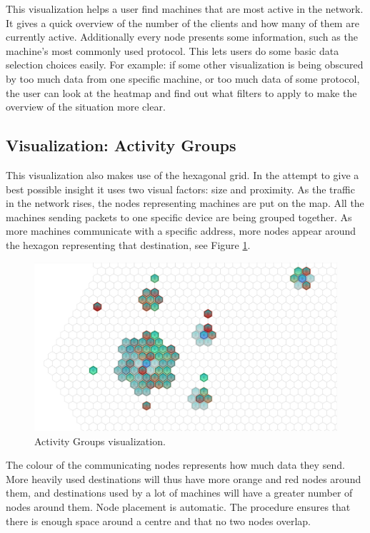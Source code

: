 This visualization helps a user find machines that are most active in the network.
It gives a quick overview of the number of the clients and how many of them are currently active.
Additionally every node presents some information, such as the machine's most commonly used protocol. This lets users do some basic data selection choices easily. For example: if some other visualization is being obscured by too much data from one specific machine, or too much data of some protocol, the user can look at the heatmap and find out what filters to apply to make the overview of the situation more clear.

\subsection{Visualization: Activity Groups}
%
This visualization also makes use of the hexagonal grid. In the attempt to give a best possible
insight it uses two visual factors: size and proximity. As the traffic in the network rises, the
nodes representing machines are put on the map. All the machines sending packets to one specific
device are being grouped together. As more machines communicate with a specific address, more nodes
appear around the hexagon representing that destination, see Figure \ref{fig:groups}.

\begin{figure}[htb]
   \centering
   \includegraphics[width=\linewidth]{materials/groups.jpg}
   \caption[Activity Groups]{\label{fig:groups}
         Activity Groups visualization.}
\end{figure}

The colour of the communicating nodes represents how much data they send. More heavily used
destinations will thus have more orange and red nodes around them, and destinations used by a lot of
machines will have a greater number of nodes around them. Node placement is automatic. The procedure
ensures that there is enough space around a centre and that no two nodes overlap.

